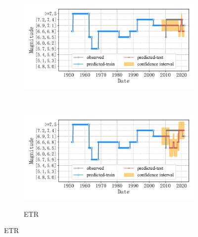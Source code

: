 \begin{figure}[!htbp]
\begin{subfigure}[b]{0.45\textwidth}
    \includegraphics[width=\textwidth]{Img/chap5_seism/future10_class/seism_kn_minyear_1932_maxyear_2021_spanlat_2_spanlon_4_timewindow_120_nextmonth_120_minmag_3.0_split_ratio_0.8_blocks1_class.pdf}
    \vspace{-1cm}
    \label{fig:seism_knn_minyear_1932_maxyear_2021_spanlat_2_spanlon_4_timewindow_120_nextmonth_120_minmag_3.0_split_ratio_0.8_blocks1_class}
  \end{subfigure}
  ~
  \begin{subfigure}[b]{0.45\textwidth}
    \caption{ETR}
    \vspace{-0.2cm}
    \includegraphics[width=\textwidth]{Img/chap5_seism/future10_class/seism_etr_minyear_1932_maxyear_2021_spanlat_2_spanlon_4_timewindow_120_nextmonth_120_minmag_3.0_split_ratio_0.8_blocks1_class.pdf}
    \vspace{-1cm}
    \label{fig:seism_etr_minyear_1932_maxyear_2021_spanlat_2_spanlon_4_timewindow_120_nextmonth_120_minmag_3.0_split_ratio_0.8_blocks1_class}
  \end{subfigure}
  \label{fig:seism_minyear_1932_maxyear_2021_spanlat_2_spanlon_4_timewindow_120_nextmonth_120_minmag_3.0_split_ratio_0.8_blocks1_class}
\end{figure}

